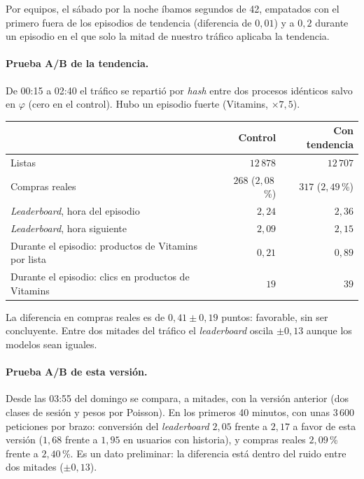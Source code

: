 \documentclass[11pt,a4paper]{article}
\begin{document}
Por equipos, el sábado por la noche íbamos segundos de 42, empatados con el primero fuera de los episodios
de tendencia (diferencia de $0{,}01$) y a $0{,}2$ durante un episodio en el que solo la mitad de nuestro
tráfico aplicaba la tendencia.

\paragraph{Prueba A/B de la tendencia.} De 00:15 a 02:40 el tráfico se repartió por \emph{hash} entre dos
procesos idénticos salvo en $\varphi$ (cero en el control). Hubo un episodio fuerte (Vitamins, $\times7{,}5$).

\begin{center}
\small
\begin{tabular}{lrr}
\toprule
 & Control & Con tendencia\\
\midrule
Listas & $12\,878$ & $12\,707$\\
Compras reales & $268$ ($2{,}08$\,\%) & $317$ ($2{,}49$\,\%)\\
\emph{Leaderboard}, hora del episodio & $2{,}24$ & $2{,}36$\\
\emph{Leaderboard}, hora siguiente & $2{,}09$ & $2{,}15$\\
Durante el episodio: productos de Vitamins por lista & $0{,}21$ & $0{,}89$\\
Durante el episodio: clics en productos de Vitamins & $19$ & $39$\\
\bottomrule
\end{tabular}
\end{center}

La diferencia en compras reales es de $0{,}41\pm0{,}19$ puntos: favorable, sin ser concluyente. Entre dos
mitades del tráfico el \emph{leaderboard} oscila $\pm0{,}13$ aunque los modelos sean iguales.

\paragraph{Prueba A/B de esta versión.} Desde las 03:55 del domingo se compara, a mitades, con la versión
anterior (dos clases de sesión y pesos por Poisson). En los primeros 40 minutos, con unas $3\,600$
peticiones por brazo: conversión del \emph{leaderboard} $2{,}05$ frente a $2{,}17$ a favor de esta
versión ($1{,}68$ frente a $1{,}95$ en usuarios con historia), y compras reales $2{,}09$\,\% frente a
$2{,}40$\,\%. Es un dato preliminar: la diferencia está dentro del ruido entre dos mitades ($\pm0{,}13$).
\end{document}
